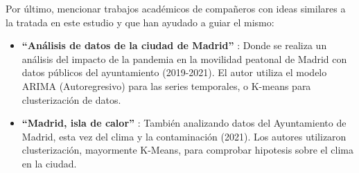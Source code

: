 	Por último, mencionar trabajos académicos de compañeros con ideas similares a la tratada en este estudio y que han ayudado a guiar el mismo:
	\begin{itemize}
		\item \textbf{``Análisis de datos de la ciudad de Madrid''} \citep{SaizSantos2023}: Donde se realiza un análisis del impacto de la pandemia en la movilidad peatonal de Madrid con datos públicos del ayuntamiento (2019-2021). El autor utiliza el modelo ARIMA (Autoregresivo) para las series temporales, o K-means para clusterización de datos. %
		
		\item \textbf{``Madrid, isla de calor''} \citep{Meneses2023Madrid}: También analizando datos del Ayuntamiento de Madrid, esta vez del clima y la contaminación (2021). Los autores utilizaron clusterización, mayormente K-Means, para comprobar hipotesis sobre el clima en la ciudad.  %
		
	\end{itemize} 
	